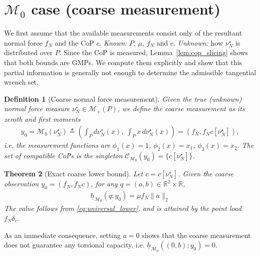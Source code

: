 \documentclass[11pt,a4paper]{article}
\theoremstyle{plain}
\newtheorem{theorem}{Theorem}[section]
\newtheorem{definition}[theorem]{Definition}
\begin{document}
\section{$\mathcal{M}_0$ case (coarse measurement)}
\label{sec:M0}

We first assume that the available measurements consist only of the resultant normal force $f_N$ and the CoP $c$.
\textit{Known:} $P$, $\mu$, $f_N$ and $c$. \textit{Unknown:} how $\nu_N^\star$ is distributed over $P$.
Since the CoP is measured, Lemma~\ref{lem:cop_slicing} shows that both bounds are GMPs. We compute them explicitly and show
that this partial information is generally not enough to determine the admissible tangential wrench set.

\begin{definition}[Coarse normal force measurement]\label{def:coarse_measurement}
    Given the true (unknown) normal force measure $\nu_N^\star\in\mathcal M_+(P)$,
    we define the coarse measurement as its zeroth and first moments
    \begin{align}
    y_0 = \mathcal M_0(\nu_N^\star) \triangleq \left(\int_P d\nu_N^\star(x),\;\int_P x\,d\nu_N^\star(x)\right) = (f_N,f_Nc[\nu_N^\star]),
    \end{align}
    i.e. the measurement functions are $\phi_1(x)=1$, $\phi_2(x)=x_1$, $\phi_3(x)=x_2$. The set of compatible CoPs is the singleton $\mathcal C_{\mathcal M_0}(y_0)=\{c[\nu_N^\star]\}$.
\end{definition}

\begin{theorem}[Exact coarse lower bound]
\label{thm:coarse_lower}
    Let $c=c[\nu_N^\star]$. Given the coarse observation $y_0=(f_N, f_Nc)$, for any $q=(a,b)\in\mathbb R^2\times\mathbb R$,
    \begin{align}
            \boxed{\underline h_{\mathcal M_0}(q;y_0) = \mu f_N\|a\|_2}
    \end{align}
    The value follows from \eqref{eq:universal_lower}, and is attained by the point load $f_N\delta_c$.
\end{theorem}

As an immediate consequence, setting $a=0$ shows that the coarse measurement does not guarantee any torsional capacity, i.e. $\underline h_{\mathcal M_0}((0,b);y_0)=0$.
\end{document}
